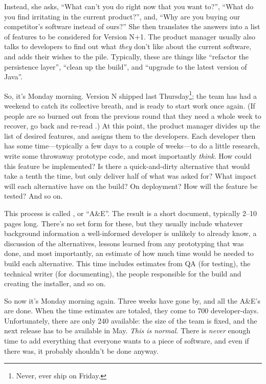 \documentclass{report}
\begin{document}
Instead, she asks, ``What can't you do right now that you want to?'',
``What do you find irritating in the current product?'', and, ``Why
are you buying our competitor's software instead of ours?''  She then
translates the answers into a list of features to be considered for
Version N+1.  The product manager usually also talks to developers to
find out what \emph{they} don't like about the current software, and
adds their wishes to the pile.  Typically, these are things like
``refactor the persistence layer'', ``clean up the build'', and
``upgrade to the latest version of Java''.

So, it's Monday morning.  Version N shipped last
Thursday\footnote{Never, ever ship on Friday.}; the team has had a
weekend to catch its collective breath, and is ready to start work
once again.  (If people are so burned out from the previous round that
they need a whole week to recover, go back and re-read
.)  At this point, the product manager
divides up the list of desired features, and assigns them to the
developers.  Each developer then has some time---typically a few days
to a couple of weeks---to do a little research, write some throwaway
prototype code, and most importantly \emph{think}.  How could this
feature be implemented?  Is there a quick-and-dirty alternative that
would take a tenth the time, but only deliver half of what was asked
for?  What impact will each alternative have on the build?  On
deployment?  How will the feature be tested?  And so on.

This process is called , or ``A\&E''.
The result is a short document, typically 2--10 pages long.  There's
no set form for these, but they usually include whatever background
information a well-informed developer is unlikely to already know, a
discussion of the alternatives, lessons learned from any prototyping
that was done, and most importantly, an estimate of how much time
would be needed to build each alternative.  This time includes
estimates from QA (for testing), the technical writer (for
documenting), the people responsible for the build and creating the
installer, and so on.

So now it's Monday morning again.  Three weeks have gone by, and all
the A\&E's are done.  When the time estimates are totaled, they come
to 700 developer-days.  Unfortunately, there are only 240 available:
the size of the team is fixed, and the next release has to be
available in May.  \emph{This is normal.} There is \emph{never} enough
time to add everything that everyone wants to a piece of software, and
even if there was, it probably shouldn't be done anyway.
\end{document}
